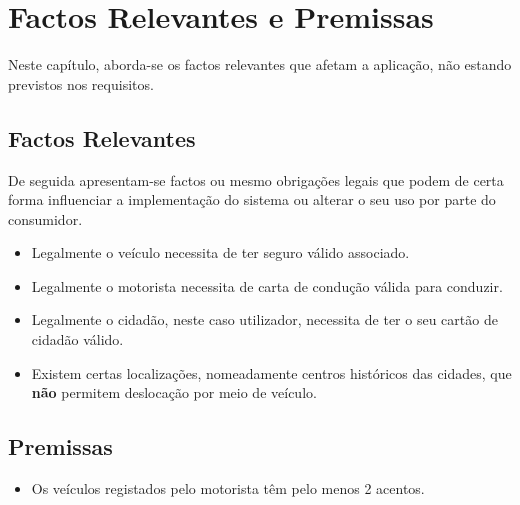 \chapter{Factos Relevantes e Premissas}
\hspace{5mm} Neste capítulo, aborda-se os factos relevantes que afetam a aplicação, não estando previstos nos requisitos.

\section{Factos Relevantes}

De seguida apresentam-se factos ou mesmo obrigações legais que podem de certa forma influenciar a implementação do sistema ou alterar o seu uso por parte do consumidor. 

\begin{itemize}
    \item Legalmente o veículo necessita de ter seguro válido associado.
    \item Legalmente o motorista necessita de carta de condução válida para conduzir.
    \item Legalmente o cidadão, neste caso utilizador, necessita de ter o seu cartão de cidadão válido.
    \item Existem certas localizações, nomeadamente centros históricos das cidades, que \textbf{não} permitem deslocação por meio de veículo.
\end{itemize}

\section{Premissas}

\begin{itemize}
    \item Os veículos registados pelo motorista têm pelo menos 2 acentos.
\end{itemize}


